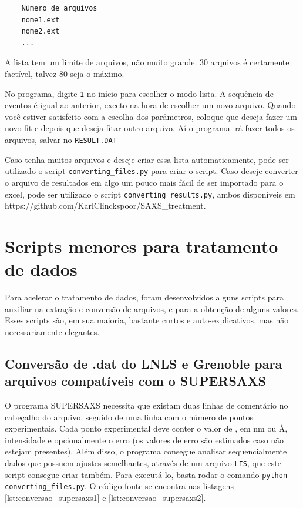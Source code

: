 \begin{apendicesenv}
\begin{linenumbers}
	\begin{verbatim}
	Número de arquivos
	nome1.ext
	nome2.ext
	...
	\end{verbatim}
\end{linenumbers}
\resetlinenumber[1]

A lista tem um limite de arquivos, não muito grande. 30 arquivos é certamente factível, talvez 80 seja o máximo.

No programa, digite \texttt{1} no início para escolher o modo lista. A sequência de eventos é igual ao anterior, exceto na hora de escolher um novo arquivo. Quando você estiver satisfeito com a escolha dos parâmetros, coloque que deseja fazer um novo fit e depois que deseja fitar outro arquivo. Aí o programa irá fazer todos os arquivos, salvar no \texttt{RESULT.DAT}

Caso tenha muitos arquivos e deseje criar essa lista automaticamente, pode ser utilizado o script \texttt{converting\_files.py} para criar o script. Caso deseje converter o arquivo de resultados em algo um pouco mais fácil de ser importado para o excel, pode ser utilizado o script \texttt{converting\_results.py}, ambos disponíveis em \\https://github.com/KarlClinckspoor/SAXS\_treatment.

\chapter{Scripts menores para tratamento de dados}

Para acelerar o tratamento de dados, foram desenvolvidos alguns scripts para auxiliar na extração e conversão de arquivos, e para a obtenção de alguns valores. Esses scripts são, em sua maioria, bastante curtos e auto-explicativos, mas não necessariamente elegantes.

\section{Conversão de .dat do LNLS e Grenoble para arquivos compatíveis com o SUPERSAXS}

O programa SUPERSAXS necessita que existam duas linhas de comentário no cabeçalho do arquivo, seguido de uma linha com o número de pontos experimentais. Cada ponto experimental deve conter o valor de \q, em nm ou Å, intensidade e opcionalmente o erro (os valores de erro são estimados caso não estejam presentes). Além disso, o programa consegue analisar sequencialmente dados que possuem ajustes semelhantes, através de um arquivo \texttt{LIS}, que este script consegue criar também. Para executá-lo, basta rodar o comando \texttt{python converting\_files.py}. O código fonte se encontra nas listagens \ref{lst:conversao_supersaxs1} e \ref{lst:conversao_supersaxs2}.


\end{apendicesenv}
